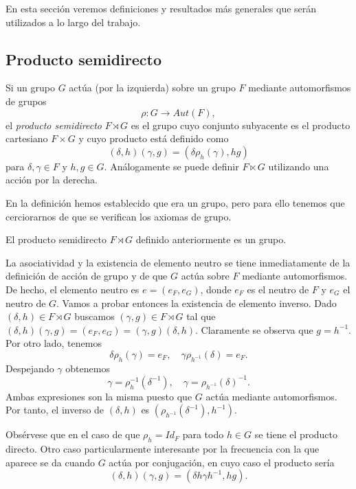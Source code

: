 \documentclass[TFG.tex]{subfiles}
\begin{document}
En esta sección veremos definiciones y resultados más generales  que serán utilizados a lo largo del trabajo. 
\subsection{Producto semidirecto}\label{semidirectproduct}

\begin{defi}
Si un grupo $G$ actúa (por la izquierda) sobre un grupo $F$ mediante automorfismos de grupos
\[
\rho: G\to Aut(F),
\]
el \emph{producto semidirecto} $F\rtimes G$ es el grupo cuyo conjunto subyacente es el producto cartesiano $F\times G$ y cuyo producto está definido como 
\[
(\delta,h)(\gamma,g)=(\delta\rho_h(\gamma),hg)
\]
para $\delta,\gamma\in F$ y $h,g\in G$. Análogamente se puede definir $F\ltimes G$ utilizando una acción por la derecha. 
\end{defi}

En la definición hemos establecido que era un grupo, pero para ello tenemos que cerciorarnos de que se verifican los axiomas de grupo.

\begin{prop}
El producto semidirecto $F\rtimes G$ definido anteriormente es un grupo.
\end{prop}
\begin{dem}
La asociatividad y la existencia de elemento neutro se tiene inmediatamente de la definición de acción de grupo y de que $G$ actúa sobre $F$ mediante automorfismos. De hecho, el elemento neutro es $e=(e_F,e_G)$, donde $e_F$ es el neutro de $F$ y $e_G$ el neutro de $G$. Vamos a probar entonces la existencia de elemento inverso. Dado $(\delta,h)\in F\rtimes G$ buscamos $(\gamma,g)\in F\rtimes G$ tal que $(\delta,h)(\gamma,g)=(e_F,e_G)=(\gamma,g)(\delta,h)$. Claramente se observa que $g=h^{-1}$. Por otro lado, tenemos
\[
\delta\rho_h(\gamma)=e_F, \quad \gamma \rho_{h^{-1}}(\delta)=e_F.
\]
Despejando $\gamma$ obtenemos
\[
\gamma=\rho_{h}^{-1}(\delta^{-1}),\quad \gamma=\rho_{h^{-1}}(\delta)^{-1}.
\]
Ambas expresiones son la misma puesto que $G$ actúa mediante automorfismos. Por tanto, el inverso de $(\delta,h)$ es $(\rho_{h^{-1}}(\delta^{-1}), h^{-1})$. \QED
\end{dem}

 Obsérvese que en el caso de que $\rho_h=Id_F$ para todo $h\in G$ se tiene el producto directo. Otro caso particularmente interesante por la frecuencia con la que aparece se da cuando $G$ actúa por conjugación, en cuyo caso el producto sería
\[
(\delta,h)(\gamma,g)=(\delta h\gamma h^{-1},hg).
\]
\end{document}
